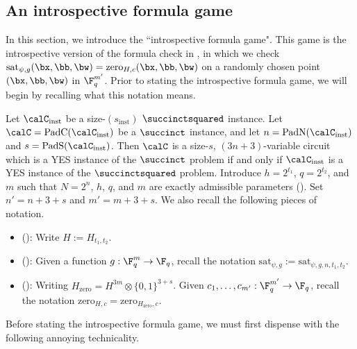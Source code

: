\subsection{An introspective formula game}\label{sec:introspective-formula}

In this section, we introduce the ``introspective formula game".
This game is the introspective version of the formula check in ,
in which we check $\mathrm{sat}_{\psi, g}(\bx, \bb, \bw) = \mathrm{zero}_{H, c}(\bx, \bb, \bw)$
on a randomly chosen point $(\bx, \bb, \bw)$ in $\F_q^{m'}$.
Prior to stating the introspective formula game,
we will begin by recalling what this notation means.

Let $\calC_{\mathrm{inst}}$ be a size-$(s_{\mathrm{inst}})$ $\succinctsquared$ instance.
Let $\calC = \mathrm{PadC}(\calC_{\mathrm{inst}})$ be a $\succinct$ instance,
and let $n = \mathrm{PadN}(\calC_{\mathrm{inst}})$ and $s = \mathrm{PadS}(\calC_{\mathrm{inst}})$.
Then $\calC$ is a size-$s$, $(3n+3)$-variable circuit
which is a YES instance of the $\succinct$ problem if and only if $\calC_{\mathrm{inst}}$
is a YES instance of the $\succinctsquared$  problem.
Introduce $h = 2^{t_1}$, $q = 2^{t_2}$, and $m$ such that $N=2^n$, $h$, $q$, and $m$ are exactly admissible parameters ().
Set $n' = n + 3 + s$ and $m' = m + 3 + s$.
We also recall the following pieces of notation.
\begin{itemize}
\item[$\circ$] (): Write $H := H_{t_1, t_2}$.
\item[$\circ$]  (): Given a function $g:\F_q^m \rightarrow \F_q$,
recall the notation $\mathrm{sat}_{\psi,g} := \mathrm{sat}_{\psi,g, n, t_1, t_2}$.
\item[$\circ$]  (): Writing $H_{\mathrm{zero}} = H^{3m} \otimes \{0, 1\}^{3 + s}$.
Given $c_1, \ldots, c_{m'} : \F_q^{m'} \rightarrow \F_q$, recall the notation $\mathrm{zero}_{H,c} = \mathrm{zero}_{H_{\mathrm{zero}}, c}$.
\end{itemize}

Before stating the introspective formula game, we must first dispense with the following annoying technicality.

